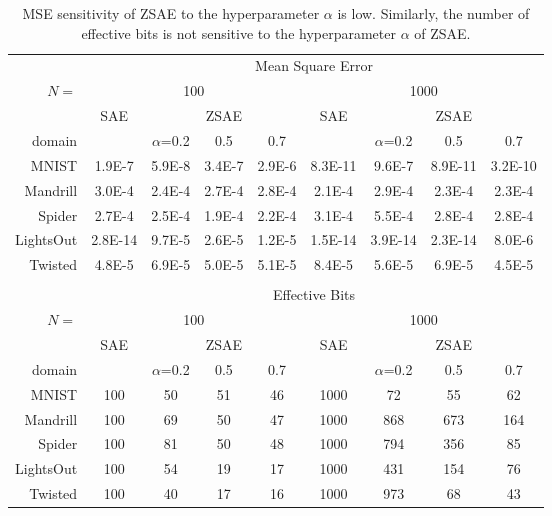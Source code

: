 \documentclass[10pt,letterpaper]{article}
\begin{document}
\begin{table}[htbp]
 \centering
 \setlength{\tabcolsep}{0.25em}
 \begin{tabular}{|r|*{8}{c|}}
     & \multicolumn{8}{c|}{Mean Square Error} \\
$N=$ & \multicolumn{4}{c|}{100} & \multicolumn{4}{c|}{1000} \\
     & SAE & \multicolumn{3}{c|}{ZSAE} & SAE & \multicolumn{3}{c|}{ZSAE} \\
domain    &   & $\alpha$=0.2 & 0.5  & 0.7 &   & $\alpha$=0.2 & 0.5  & 0.7 \\ 
MNIST     & 1.9E-7  &5.9E-8 & 3.4E-7 & 2.9E-6 &8.3E-11 &9.6E-7  & 8.9E-11 &3.2E-10 \\ 
Mandrill  & 3.0E-4  &2.4E-4 & 2.7E-4 & 2.8E-4 &2.1E-4  &2.9E-4  & 2.3E-4  &2.3E-4  \\ 
Spider    & 2.7E-4  &2.5E-4 & 1.9E-4 & 2.2E-4 &3.1E-4  &5.5E-4  & 2.8E-4  &2.8E-4  \\ 
LightsOut & 2.8E-14 &9.7E-5 & 2.6E-5 & 1.2E-5 &1.5E-14 &3.9E-14 & 2.3E-14 &8.0E-6  \\ 
Twisted   & 4.8E-5  &6.9E-5 & 5.0E-5 & 5.1E-5 &8.4E-5  &5.6E-5  & 6.9E-5  &4.5E-5  \\
\multicolumn{9}{c}{}\\
     & \multicolumn{8}{c|}{Effective Bits} \\
$N=$ & \multicolumn{4}{c|}{100} & \multicolumn{4}{c|}{1000} \\
     & SAE & \multicolumn{3}{c|}{ZSAE} & SAE & \multicolumn{3}{c|}{ZSAE} \\
domain    &   & $\alpha$=0.2 & 0.5  & 0.7 &   & $\alpha$=0.2 & 0.5  & 0.7 \\ 
MNIST     & 100 & 50 & 51 & 46 & 1000 & 72  & 55  & 62  \\ 
Mandrill  & 100 & 69 & 50 & 47 & 1000 & 868 & 673 & 164 \\ 
Spider    & 100 & 81 & 50 & 48 & 1000 & 794 & 356 & 85  \\ 
LightsOut & 100 & 54 & 19 & 17 & 1000 & 431 & 154 & 76  \\ 
Twisted   & 100 & 40 & 17 & 16 & 1000 & 973 & 68  & 43  \\ 
\end{tabular}
 \caption{
MSE sensitivity of ZSAE to the hyperparameter $\alpha$ is low.
Similarly,
the number of effective bits is not sensitive to the hyperparameter $\alpha$ of ZSAE.
}
\label{tab:more-sensitivity}
\end{table}

\clearpage
\end{document}
